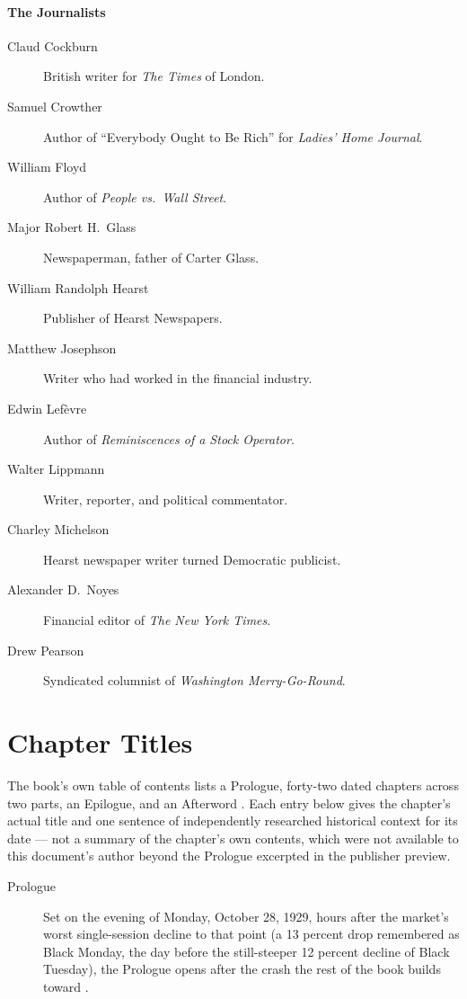 \documentclass[11pt]{article}
\begin{document}
\paragraph{The Journalists}
\begin{description}
\item[Claud Cockburn] British writer for \emph{The Times} of London.
\item[Samuel Crowther] Author of ``Everybody Ought to Be Rich'' for
\emph{Ladies' Home Journal}.
\item[William Floyd] Author of \emph{People vs.\ Wall Street}.
\item[Major Robert H.\ Glass] Newspaperman, father of Carter Glass.
\item[William Randolph Hearst] Publisher of Hearst Newspapers.
\item[Matthew Josephson] Writer who had worked in the financial industry.
\item[Edwin Lef\`evre] Author of \emph{Reminiscences of a Stock Operator}.
\item[Walter Lippmann] Writer, reporter, and political commentator.
\item[Charley Michelson] Hearst newspaper writer turned Democratic publicist.
\item[Alexander D.\ Noyes] Financial editor of \emph{The New York Times}.
\item[Drew Pearson] Syndicated columnist of \emph{Washington Merry-Go-Round}.
\end{description}

\section{Chapter Titles}
\label{sec:chapter-titles}

The book's own table of contents lists a Prologue, forty-two dated chapters
across two parts, an Epilogue, and an Afterword \autocite{vitalsource1929}. Each
entry below gives the chapter's actual title and one sentence of independently
researched historical context for its date --- not a summary of the chapter's
own contents, which were not available to this document's author beyond the
Prologue excerpted in the publisher preview.

\begin{description}
\item[Prologue] Set on the evening of Monday, October 28, 1929, hours after the
market's worst single-session decline to that point (a 13 percent drop
remembered as Black Monday, the day before the still-steeper 12 percent decline
of Black Tuesday), the Prologue opens after the crash the rest of the book
builds toward \autocite{sorkinPreviewPDF}.
\end{description}
\end{document}
